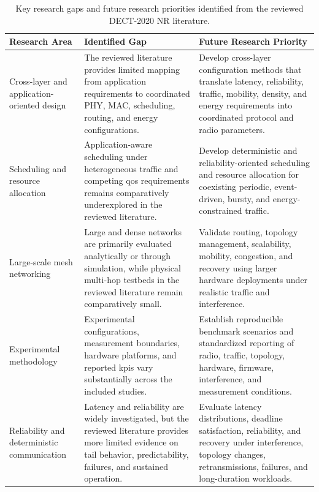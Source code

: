 \begin{table}[!t]
\centering
\caption{Key research gaps and future research priorities identified from the
reviewed DECT-2020 NR literature.}
\label{tab:research_gaps}
\renewcommand{\arraystretch}{1.12}
\small
\begin{tabular}{p{3.0cm} p{5.3cm} p{7.0cm}}
\hline
\textbf{Research Area} &
\textbf{Identified Gap} &
\textbf{Future Research Priority} \\
\hline

Cross-layer and application-oriented design &
The reviewed literature provides limited mapping from application requirements
to coordinated PHY, MAC, scheduling, routing, and energy configurations. &
Develop cross-layer configuration methods that translate latency, reliability,
traffic, mobility, density, and energy requirements into coordinated protocol
and radio parameters. \\

Scheduling and resource allocation &
Application-aware scheduling under heterogeneous traffic and competing
\gls{qos} requirements remains comparatively underexplored in the reviewed
literature. &
Develop deterministic and reliability-oriented scheduling and resource
allocation for coexisting periodic, event-driven, bursty, and
energy-constrained traffic. \\

Large-scale mesh networking &
Large and dense networks are primarily evaluated analytically or through
simulation, while physical multi-hop testbeds in the reviewed literature
remain comparatively small. &
Validate routing, topology management, scalability, mobility, congestion, and
recovery using larger hardware deployments under realistic traffic and
interference. \\

Experimental methodology &
Experimental configurations, measurement boundaries, hardware platforms, and
reported \glspl{kpi} vary substantially across the included studies. &
Establish reproducible benchmark scenarios and standardized reporting of radio,
traffic, topology, hardware, firmware, interference, and measurement
conditions. \\

Reliability and deterministic communication &
Latency and reliability are widely investigated, but the reviewed literature
provides more limited evidence on tail behavior, predictability, failures, and
sustained operation. &
Evaluate latency distributions, deadline satisfaction, reliability, and
recovery under interference, topology changes, retransmissions, failures, and
long-duration workloads. \\


\end{tabular}
\end{table}
